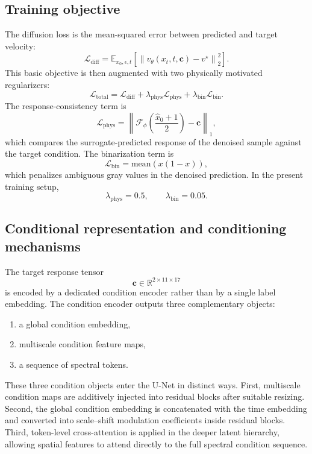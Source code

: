\documentclass[10pt,a4paper]{article}
\newcommand{\loss}{\mathcal{L}}
\begin{document}
\subsection{Training objective}

The diffusion loss is the mean-squared error between predicted and target velocity:
\begin{equation}
\loss_{\mathrm{diff}}=\mathbb{E}_{x_0,\epsilon,t}\left[\left\|v_{\theta}(x_t,t,\mathbf{c})-v^\star\right\|_2^2\right].
\end{equation}
This basic objective is then augmented with two physically motivated regularizers:
\begin{equation}
\loss_{\mathrm{total}}=\loss_{\mathrm{diff}}+\lambda_{\mathrm{phys}}\loss_{\mathrm{phys}}+\lambda_{\mathrm{bin}}\loss_{\mathrm{bin}}.
\end{equation}
The response-consistency term is
\begin{equation}
\loss_{\mathrm{phys}}=\left\|\mathcal{F}_{\phi}\!\left(\frac{\hat{x}_0+1}{2}\right)-\mathbf{c}\right\|_1,
\end{equation}
which compares the surrogate-predicted response of the denoised sample against the target condition. The binarization term is
\begin{equation}
\loss_{\mathrm{bin}}=\mathrm{mean}\!\left(x(1-x)\right),
\end{equation}
which penalizes ambiguous gray values in the denoised prediction. In the present training setup,
\begin{equation}
\lambda_{\mathrm{phys}}=0.5,\qquad \lambda_{\mathrm{bin}}=0.05.
\end{equation}

\subsection{Conditional representation and conditioning mechanisms}

The target response tensor
\begin{equation}
\mathbf{c}\in\mathbb{R}^{2\times11\times17}
\end{equation}
is encoded by a dedicated condition encoder rather than by a single label embedding. The condition encoder outputs three complementary objects:
\begin{enumerate}[leftmargin=1.5em]
\item a global condition embedding,
\item multiscale condition feature maps,
\item a sequence of spectral tokens.
\end{enumerate}
These three condition objects enter the U-Net in distinct ways. First, multiscale condition maps are additively injected into residual blocks after suitable resizing. Second, the global condition embedding is concatenated with the time embedding and converted into scale--shift modulation coefficients inside residual blocks. Third, token-level cross-attention is applied in the deeper latent hierarchy, allowing spatial features to attend directly to the full spectral condition sequence.
\end{document}
